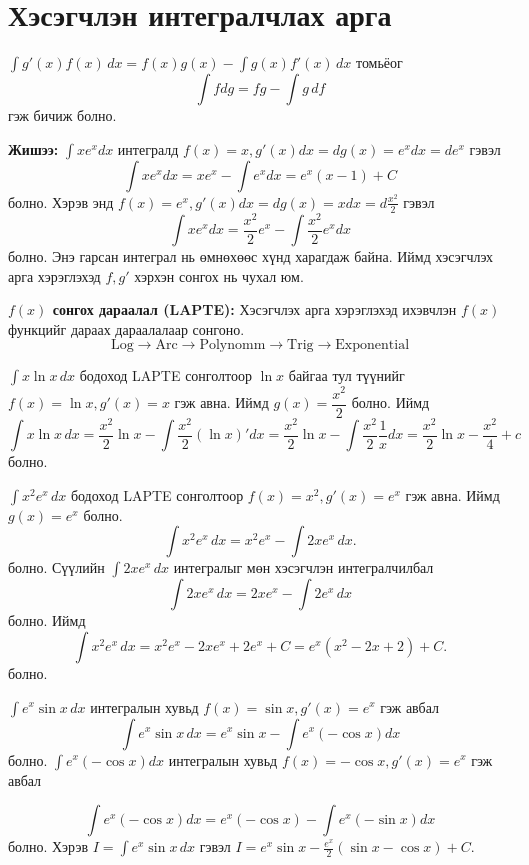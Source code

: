 \section{Хэсэгчлэн интегралчлах арга}
$\displaystyle \int g'(x)f(x)\,dx = f(x)g(x) - \int g(x)f'(x)\,dx$ томьёог
\[
\int fdg = fg - \int g\,df
\] гэж бичиж болно. 

\textbf{Жишээ:}
$\int x e^x dx $ интегралд $f(x)=x, g'(x)dx=dg(x)=e^xdx=de^x$ гэвэл
\[
\int x e^x dx = xe^x - \int e^x dx = e^x(x -1)+C
\] болно. Хэрэв энд $f(x)=e^x, g'(x)dx=dg(x)=xdx=d\frac{x^2}{2}$ гэвэл
\[
\int x e^x dx = \frac{x^2}{2}e^x - \int \frac{x^2}{2}e^x dx
\] болно. Энэ гарсан интеграл нь өмнөхөөс хүнд харагдаж байна. Иймд хэсэгчлэх арга хэрэглэхэд $f, g'$ хэрхэн сонгох нь чухал юм.

\textbf{$f(x)$ сонгох дараалал (LAPTE):} Хэсэгчлэх арга хэрэглэхэд ихэвчлэн $f(x)$ функцийг дараах дараалалаар сонгоно.
\[
\text{Log} \rightarrow \text{Arc} \rightarrow \text{Polynomm} \rightarrow \text{Trig} \rightarrow \text{Exponential}
\]
\begin{example}
    $\displaystyle\int x\ln x \,dx$ бодоход LAPTE сонголтоор $\ln x$ байгаа тул түүнийг $f(x)=\ln x, g'(x)=x$ гэж авна. Иймд $g(x)=\dfrac{x^2}{2}$ болно. Иймд 
    $$\int x\ln x \,dx=\dfrac{x^2}{2}\ln x-\int \dfrac{x^2}{2}(\ln x)'dx=\dfrac{x^2}{2}\ln x-\int \dfrac{x^2}{2}\dfrac{1}{x}dx=\dfrac{x^2}{2}\ln x-\dfrac{x^2}{4}+c$$ болно.
\end{example}
\begin{example} $\int x^{2}e^{x}\,dx$ бодоход LAPTE сонголтоор $f(x)=x^2, g'(x)=e^x$ гэж авна. Иймд $g(x)=e^x$ болно.
 \[
\int x^{2}e^{x}\,dx
= x^{2}e^{x}-\int 2xe^{x}\,dx.
\] болно.
Сүүлийн $\displaystyle\int 2xe^{x}\,dx$ интегралыг мөн хэсэгчлэн интегралчилбал 
$$\int 2xe^{x}\,dx= 2xe^{x}-\int 2e^{x}\,dx$$ болно. Иймд 
\[
\int x^{2}e^{x}\,dx= x^{2}e^{x}-2xe^{x}+2e^{x}+C
= e^{x}(x^{2}-2x+2)+C.
\]
болно.
\end{example} 
\begin{example} $\displaystyle\int e^{x}\sin x\,dx $ интегралын хувьд  $f(x)=\sin x, g'(x)=e^x$ гэж авбал
    \[
\int e^{x}\sin x\,dx =e^x\sin x-\int e^x (-\cos x) dx
\]
болно. $\int e^x (-\cos x) dx$ интегралын хувьд  $f(x)=-\cos x, g'(x)=e^x$ гэж авбал

$$\int e^x (-\cos x) dx=e^x (-\cos x)-\int e^x(-\sin x) dx$$ болно. Хэрэв $I=\displaystyle\int e^{x}\sin x\,dx$ гэвэл 
$I=e^x\sin x-\frac{e^{x}}{2}(\sin x - \cos x) + C.$
\end{example}
\newpage
